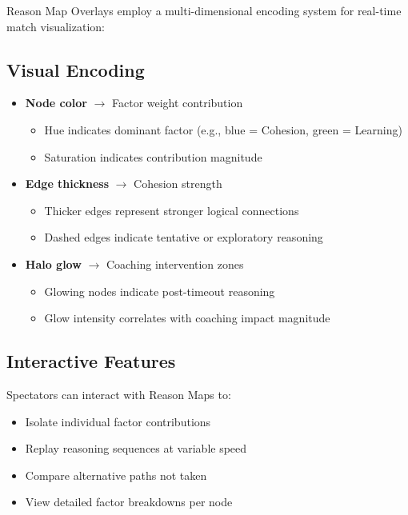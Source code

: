 Reason Map Overlays employ a multi-dimensional encoding system for real-time match visualization:

\subsection{Visual Encoding}

\begin{itemize}[leftmargin=*]
  \item \textbf{Node color} $\rightarrow$ Factor weight contribution
  \begin{itemize}
    \item Hue indicates dominant factor (e.g., blue = Cohesion, green = Learning)
    \item Saturation indicates contribution magnitude
  \end{itemize}
  
  \item \textbf{Edge thickness} $\rightarrow$ Cohesion strength
  \begin{itemize}
    \item Thicker edges represent stronger logical connections
    \item Dashed edges indicate tentative or exploratory reasoning
  \end{itemize}
  
  \item \textbf{Halo glow} $\rightarrow$ Coaching intervention zones
  \begin{itemize}
    \item Glowing nodes indicate post-timeout reasoning
    \item Glow intensity correlates with coaching impact magnitude
  \end{itemize}
\end{itemize}

\subsection{Interactive Features}

Spectators can interact with Reason Maps to:
\begin{itemize}[leftmargin=*]
  \item Isolate individual factor contributions
  \item Replay reasoning sequences at variable speed
  \item Compare alternative paths not taken
  \item View detailed factor breakdowns per node
\end{itemize}

